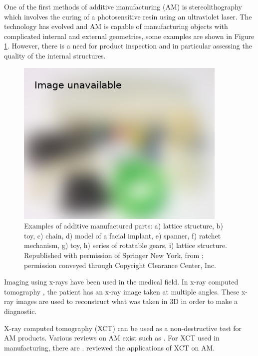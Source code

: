 One of the first methods of additive manufacturing (AM) is stereolithography \citep{kodama1981automatic, hull1986apparatus, 3d2019our} which involves the curing of a photosensitive resin using an ultraviolet laser. The technology has evolved and AM is capable of manufacturing objects with complicated internal and external geometries, some examples are shown in Figure \ref{fig:literature_3dprint}. However, there is a need for product inspection and in particular assessing the quality of the internal structures.

\begin{figure}
  \centering
  \includegraphics[width=0.9\textwidth]{../figures/literatureReview/literature_3dprint.png}
  \caption{Examples of additive manufactured parts: a) lattice structure, b) toy, c) chain, d) model of a facial implant, e) spanner, f) ratchet mechanism, g) toy, h) series of rotatable gears, i) lattice structure. Republished with permission of Springer New York, from \cite{gibson2010additive}; permission conveyed through Copyright
Clearance Center, Inc.}
  \label{fig:literature_3dprint}
\end{figure}

Imaging using x-rays \citep{rontgen1896on} have been used in the medical field. In x-ray computed tomography \citep{cormack1973reconstruction, hounsfield1973computerized, hounsfield1980computed}, the patient has an x-ray image taken at multiple angles. These x-ray images are used to reconstruct what was taken in 3D in order to make a diagnostic.

X-ray computed tomography (XCT) can be used as a non-destructive test for AM products. Various reviews on AM exist such as \cite{kruth1991material, kruth1998progress, pham1998comparison, gibson2010additive, wong2012review, ngo2018additive}. For XCT used in manufacturing, there are \cite{cantatore2011introduction, kruth2011computed, sun2012overview}. \cite{thompson2016x} reviewed the applications of XCT on AM.

